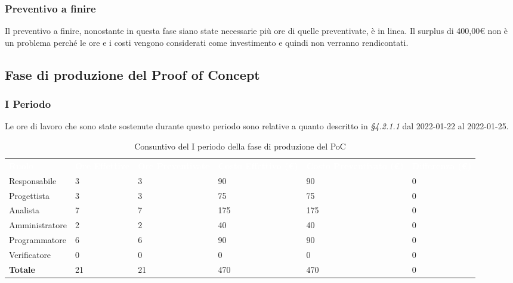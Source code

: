 \subsubsection{Preventivo a finire}
Il preventivo a finire, nonostante in questa fase siano state necessarie più ore di quelle preventivate, è in linea. Il surplus di 400,00\euro \xspace non è un problema perché le ore e i costi vengono considerati come investimento e quindi non verranno rendicontati.


\pagebreak


\subsection{Fase di produzione del Proof of Concept}

\subsubsection{I Periodo}
Le ore di lavoro che sono state sostenute durante questo periodo sono relative a quanto descritto in \textit{§4.2.1.1} dal 2022-01-22 al 2022-01-25.

\begin{table}[H]
\begin{center}
\renewcommand{\arraystretch}{1.5}
\begin{tabular}{ m{}<{\centering}  m{}<{\centering} m{}<{\centering} m{}<{\centering} m{}<{\centering} m{}<{\centering}}
	\rowcolor{darkblue}
	\textcolor{white}{\textbf{Ruolo}} & \textcolor{white}{\textbf{Ore Effettive}} & \textcolor{white}{\textbf{Ore Preventivate}}&\textcolor{white}{\textbf{Costo Effettivo (\euro) }}&\textcolor{white}{\textbf{Costo Preventivato (\euro)}}&\textcolor{white}{\textbf{Differenza (\euro)}}\\ 
	
	Responsabile  & 3 & 3 & 90 & 90 & 0 \\	
	
	Progettista & 3 & 3 & 75 & 75 & 0 \\
	
	Analista & 7 & 7 & 175 & 175 & 0 \\

	Amministratore & 2 & 2 & 40 & 40 & 0 \\
	
	Programmatore & 6 & 6 & 90 & 90 &  0 \\
	
	Verificatore & 0 & 0 & 0 & 0 & 0 \\
	
	\textbf{Totale} & 21 & 21 & 470 & 470 & 0 \\
	
\end{tabular}
\caption{Consuntivo del I periodo della fase di produzione del PoC}
\end{center}
\end{table}


